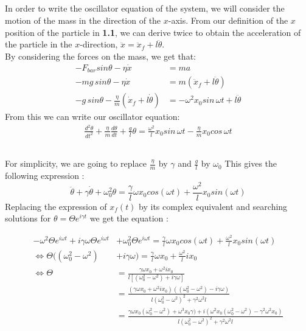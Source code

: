 \documentclass{article}
\begin{document}
\subsection{} %

In order to write the oscillator equation of the system, we will consider the motion of the mass in the direction of the $x$-axis. From our definition of the $x$ position of the particle in \textbf{1.1}, we can derive twice to obtain the acceleration of the particle in the $x$-direction, $\ddot{x} = \ddot{x}_f + l \ddot{\theta}$.\\

\noindent By considering the forces on the mass, we get that:
\begin{align*}
	-F_{bar}sin\theta - \eta \dot{x} &= ma\\
	-mg\,sin\theta - \eta \dot{x} &= m( \ddot{x}_f + l \ddot{\theta})\\
	-g\,sin\theta - \frac{\eta}{m} (\dot{x}_f + l\dot{\theta}) &= -\omega^2x_0sin \, \omega t + l \ddot{\theta}
\end{align*}
From this we can write our oscillator equation:
\begin{align*}
	 \frac{d^2 \theta}{dt^2} + \frac{\eta}{m}\frac{d \theta}{dt} + \frac{g}{l}\theta  = \frac{\omega^2}{l}x_0sin\,\omega t - \frac{\eta}{m}x_0cos\,\omega t 
\end{align*}

\subsection{} %
For simplicity, we are going to replace $\frac{\eta}{m}$ by $\gamma$ and $\frac{g}{l}$ by $\omega_0$
This gives the following expression :
$$\ddot{\theta} + \gamma\dot{\theta} + \omega_0^2\theta = \frac{\gamma}{l}\omega x_0 cos(\omega t) + \frac{\omega^2}{l}x_0sin(\omega t) $$
Replacing the expression of $x_f(t)$ by its complex equivalent and searching solutions for $\theta = \Theta e^{i\gamma t}$ we get the equation :

\begin{align*}
-\omega^2\Theta e^{i\omega t} + i\gamma \omega \Theta e^{i\omega t} &+ \omega_0^2\Theta e^{i\omega t} = \frac{\gamma}{l}\omega x_0 cos(\omega t) + \frac{\omega^2}{l}x_0sin(\omega t) \\
\Leftrightarrow \Theta ((\omega_0^2 - \omega ^2) &+ i\gamma \omega) = \frac{\gamma}{l} \omega x_0 + \frac{\omega^2}{l} ix_0 \\
\Leftrightarrow \Theta &= \frac{\gamma \omega x_0 + \omega^2 i x_0}{l[(\omega_0^2 - \omega^2) + i\gamma \omega]} \\
&=\frac{(\gamma \omega x_0 + \omega^2 i x_0)((\omega_0^2-\omega^2)-i\gamma \omega)}{l(\omega_0^2 - \omega^2)^2 + \gamma^2 \omega^2l} \\
&= \frac{\gamma \omega x_0 (\omega_0^2 - \omega^2) + \omega^3 x_0 \gamma) + i(\omega^2x_0(\omega_0^2-\omega^2) - \gamma^2\omega^2x_0)}{l(\omega_0^2 - \omega^2)^2 + \gamma^2 \omega^2l} \\
\end{align*}
\end{document}
